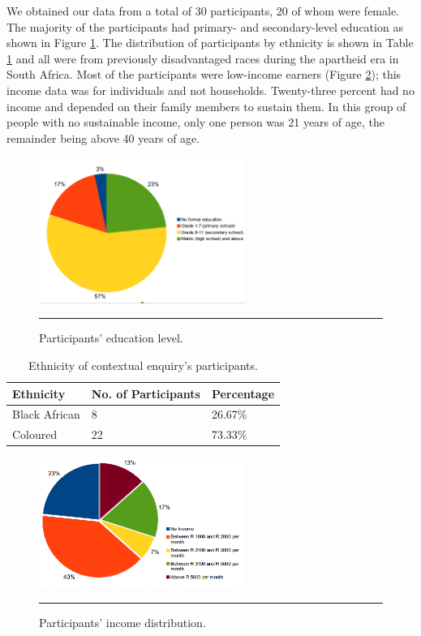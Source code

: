 We obtained our data from a total of 30 participants, 20 of whom were female. The majority of the participants had primary- and secondary-level education as shown in Figure \ref{figure:education_level}. The distribution of participants by ethnicity is shown in Table \ref{table:ethnicity} and all were from previously disadvantaged races during the apartheid era in South Africa. Most of the participants were low-income earners (Figure \ref{figure:income_distr}); this income data was for individuals and not households. Twenty-three percent had no income and depended on their family members to sustain them. In this group of people with no  sustainable income, only one person was 21 years of age, the remainder being above 40 years of age.
\begin{figure}[htbp]
  \centering
    \includegraphics[width=0.6\textwidth]{Figures/education_level.png}
    \rule{35em}{0.5pt}
  \caption{Participants' education level.}
  \label{figure:education_level}
\end{figure}

\begin{table}[h!]
  \begin{center}
    \caption{Ethnicity of contextual enquiry's participants.}
    \label{table:ethnicity}
	\begin{tabular}{|p{3cm}|p{4cm}|p{2cm}|}
		\hline
		\textbf{Ethnicity}&\textbf{No. of Participants}&\textbf{Percentage}\\
		\hline
		 Black African&8 &26.67\% \\
		\hline
		 Coloured&22& 73.33\%\\
	\hline
	\end{tabular}
  \end{center}
\end{table}

\begin{figure}[htbp]
  \centering
    \includegraphics[width=0.6\textwidth]{Figures/income_distr.png}
    \rule{35em}{0.5pt}
  \caption{Participants' income distribution.}
  \label{figure:income_distr}
\end{figure}

